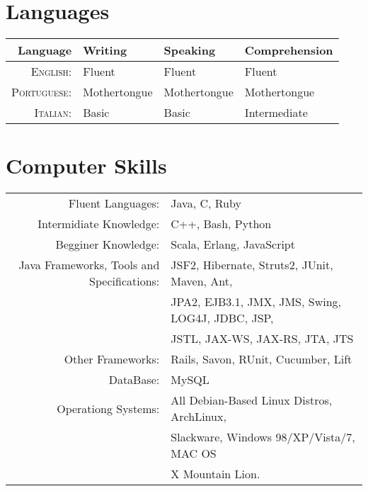 \documentclass[a4paper,10pt]{article} %
\begin{document}

\section{Languages}

\begin{tabular}{r|lll}
Language &  Writing & Speaking & Comprehension \\
\hline
\textsc{English:} & Fluent & Fluent & Fluent \\ 

\textsc{Portuguese:} & Mothertongue & Mothertongue & Mothertongue \\

\textsc{Italian:} & Basic & Basic & Intermediate\\
\end{tabular}


\section{Computer Skills}

\begin{tabular}{r|p{11cm}}
Fluent Languages: & Java, C, Ruby\\
Intermidiate Knowledge: & C++, Bash, Python\\
Begginer Knowledge: & Scala, Erlang, JavaScript\multicolumn{2}{c}{}\\

Java Frameworks, Tools and Specifications: & JSF2, Hibernate, Struts2, JUnit, Maven, Ant,\\& JPA2, EJB3.1, JMX, JMS, Swing, LOG4J, JDBC, JSP,\\& JSTL, JAX-WS, JAX-RS, JTA, JTS
\multicolumn{2}{c}{}\\

Other Frameworks: & Rails, Savon, RUnit, Cucumber, Lift \multicolumn{2}{c}{}\\

DataBase: & MySQL \multicolumn{2}{c}{}\\

Operationg Systems: & All Debian-Based Linux Distros, ArchLinux,\\& Slackware, Windows 98/XP/Vista/7, MAC OS\\& X Mountain Lion.
\end{tabular}
\end{document}
